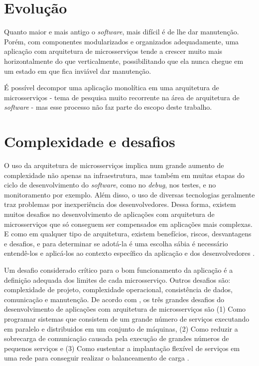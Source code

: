 \section{Evolução}

Quanto maior e mais antigo o \emph{software}, mais difícil é de lhe dar manutenção. Porém, com componentes modularizados e organizados adequadamente, uma aplicação com arquitetura de microsserviços tende a crescer muito mais horizontalmente do que verticalmente, possibilitando que ela nunca chegue em um estado em que fica inviável dar manutenção. 

É possível decompor uma aplicação monolítica em uma arquitetura de microsserviços - tema de pesquisa muito recorrente na área de arquitetura de \emph{software} - mas esse processo não faz parte do escopo deste trabalho.


\section{Complexidade e desafios}

O uso da arquitetura de microsserviços implica num grande aumento de complexidade não apenas na infraestrutura, mas também em muitas etapas do ciclo de desenvolvimento do \emph{software}, como no \emph{debug}, nos testes, e no monitoramento por exemplo. Além disso, o uso de diversas tecnologias geralmente traz problemas por inexperiência dos desenvolvedores. Dessa forma, existem muitos desafios no desenvolvimento de aplicações com arquitetura de microsserviços que só conseguem ser compensados em aplicações mais complexas. E como em qualquer tipo de arquitetura, existem benefícios, riscos, desvantagens e desafios, e para determinar se adotá-la é uma escolha sábia é necessário entendê-los e aplicá-los ao contexto específico da aplicação e dos desenvolvedores \cite{top10-microservices-challenges,martin-fowler-microservice-tradeoffs}.

Um desafio considerado crítico para o bom funcionamento da aplicação é a definição adequada dos limites de cada microsserviço. Outros desafios são: complexidade de projeto, complexidade operacional, consistência de dados, comunicação e manutenção. De acordo com , os três grandes desafios do desenvolvimento de aplicações com arquitetura de microsserviços são (1) Como programar sistemas que consistem de um grande número de serviços executando em paralelo e distribuidos em um conjunto de máquinas, (2) Como reduzir a sobrecarga de comunicação causada pela execução de grandes números de pequenos serviços e (3) Como sustentar a implantação flexível de serviços em uma rede para conseguir realizar o balanceamento de carga \cite{martin-fowler-monolith-first}.

